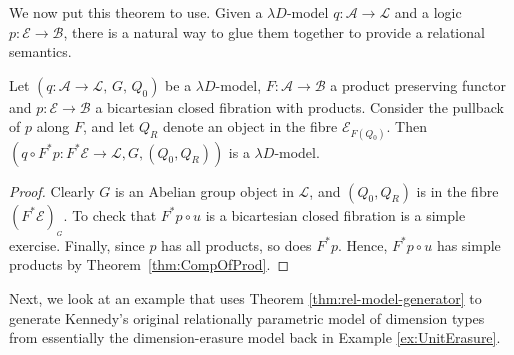 \documentclass[a4paper,UKenglish]{lipics}
\theoremstyle{plain}
\newcommand{\A}{\mathcal{A}}
\newcommand{\B}{\mathcal{B}}
\newcommand{\E}{\mathcal{E}}
\newcommand{\fibre}[2]{#1_{_{#2}}}
\newcommand{\fibreE}[1]{\E_{#1}}
\begin{document}
\noindent
\begin{minipage}[l]{0.75\linewidth}
We now put this theorem to use. Given a $\lambda D$-model $q : \A \rightarrow \mathcal{L}$ and a logic $p: \E \rightarrow \B$, there is a natural way to glue them together to provide a relational semantics.

\begin{theorem}
\label{thm:rel-model-generator}
Let $(q:\A \rightarrow \mathcal{L}, \, G,\, Q_0)$ be a $\lambda D$-model, $F:\A \rightarrow \B$ a product preserving functor and $p: \E \rightarrow \B$ a bicartesian closed fibration with products. Consider the pullback of $p$ along $F$, and let $Q_R$ denote an object in the fibre $\fibreE{F(Q_0)}$.
Then $(q \circ F^\ast p :F^{\ast} \E \rightarrow \mathcal{L}, G,(Q_0,Q_R))$  is a $\lambda D$-model.
\end{theorem}

 \end{minipage}
\begin{minipage}{0.25\textwidth}
\scalebox{0.9}{
\begin{diagram}
 F^\ast (\E)	\SEpbk	&\rTo		&\E \\
  \dTo<{F^\ast p}	&		&\dTo>{p}\\
  \A			&\rTo_{F}	&\B\\
  \dTo<{q}      	&		&\\
  \mathcal{L}		&       	&
 \end{diagram}
}
 \end{minipage}



\begin{proof}
Clearly $G$ is an Abelian group object in $\mathcal{L}$, and $(Q_0, Q_R)$ is in the fibre $\fibre{(F^\ast \E)}{G}$. To check that $F^\ast p \circ u$ is a bicartesian closed fibration is a simple exercise. Finally, since $p$ has all products, so does $F^\ast p$. Hence, $F^\ast p \circ u$ has simple products by Theorem~\ref{thm:CompOfProd}.
\end{proof}

Next, we look at an example that uses Theorem \ref{thm:rel-model-generator} to generate Kennedy's original relationally parametric model of dimension types \cite{Kennedy:1997:RPU:263699.263761} from essentially the dimension-erasure model back in Example \ref{ex:UnitErasure}.
\end{document}

